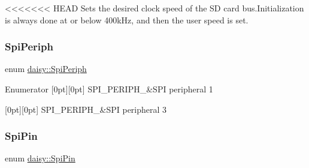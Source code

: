 <<<<<<< HEAD
Sets the desired clock speed of the SD card bus.\+Initialization is always done at or below 400k\+Hz, and then the user speed is set. \mbox{\label{namespacedaisy_af711442ff4ba0ed7d1e6f6bae7c574b6}} 
\subsubsection{\texorpdfstring{Spi\+Periph}{SpiPeriph}}
{\footnotesize\ttfamily enum \hyperlink{namespacedaisy_af711442ff4ba0ed7d1e6f6bae7c574b6}{daisy\+::\+Spi\+Periph}}

\begin{DoxyEnumFields}{Enumerator}
[0pt][0pt]{}\mbox{\label{namespacedaisy_af711442ff4ba0ed7d1e6f6bae7c574b6abe36a904be436f0e99a6c60bcdc5db03}} 
S\+P\+I\+\_\+\+P\+E\+R\+I\+P\+H\+\_&S\+PI peripheral 1 \\
\hline

[0pt][0pt]{}\mbox{\label{namespacedaisy_af711442ff4ba0ed7d1e6f6bae7c574b6a73dc62e39838820d4779ed3cbfc421c0}} 
S\+P\+I\+\_\+\+P\+E\+R\+I\+P\+H\+\_&S\+PI peripheral 3 \\
\hline

\end{DoxyEnumFields}
\mbox{\label{namespacedaisy_ab9d0e8af9fe3d0320cdf38af4ec31a1a}} 
\subsubsection{\texorpdfstring{Spi\+Pin}{SpiPin}}
{\footnotesize\ttfamily enum \hyperlink{namespacedaisy_ab9d0e8af9fe3d0320cdf38af4ec31a1a}{daisy\+::\+Spi\+Pin}}

